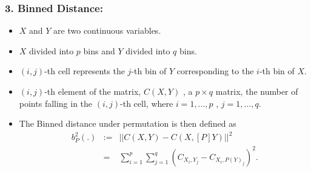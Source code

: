 \documentclass{beamer}
\begin{document}
\begin{frame}
\frametitle{3. Binned Distance:}
\begin{itemize}
\item $X$ and $Y$ are two continuous variables. 
\item $X$ divided into $p$ bins and $Y$ divided into $q$ bins. 
\item $(i,j)$-th cell represents the $j$-th bin of $Y$ corresponding to the $i$-th bin of $X$. 
\item $(i,j)$-th element of the matrix, $C(X,Y)$ , a $p \times q$ matrix, the number of points falling in the $(i,j)$-th cell, where $i = 1, \dots, p$ , $j = 1, \dots, q$.
\item The Binned distance under permutation is then defined as
\begin{eqnarray*}
b^2_P(.) &:=& ||C(X,Y) - C(X,[P]Y)||^2 \\ &=& \sum_{i=1}^p \sum_{j=1}^q (C_{X_i,Y_j} - C_{X_i,P(Y)_j})^2.
\end{eqnarray*}
\end{itemize}

\end{frame}
\end{document}
